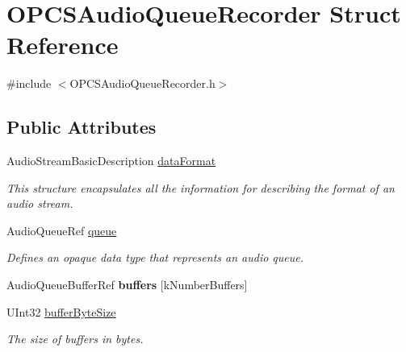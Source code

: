 \hypertarget{struct_o_p_c_s_audio_queue_recorder}{}\section{O\+P\+C\+S\+Audio\+Queue\+Recorder Struct Reference}
\label{struct_o_p_c_s_audio_queue_recorder}


{\ttfamily \#include $<$O\+P\+C\+S\+Audio\+Queue\+Recorder.\+h$>$}

\subsection*{Public Attributes}
\begin{DoxyCompactItemize}
\item 
\hypertarget{struct_o_p_c_s_audio_queue_recorder_a28f29c8faffd7725fad94e04f9795c66}{}\label{struct_o_p_c_s_audio_queue_recorder_a28f29c8faffd7725fad94e04f9795c66} 
Audio\+Stream\+Basic\+Description \hyperlink{struct_o_p_c_s_audio_queue_recorder_a28f29c8faffd7725fad94e04f9795c66}{data\+Format}
\begin{DoxyCompactList}\small\item\em This structure encapsulates all the information for describing the format of an audio stream. \end{DoxyCompactList}\item 
\hypertarget{struct_o_p_c_s_audio_queue_recorder_ab0f9b6a58c9eba28570279747b197125}{}\label{struct_o_p_c_s_audio_queue_recorder_ab0f9b6a58c9eba28570279747b197125} 
Audio\+Queue\+Ref \hyperlink{struct_o_p_c_s_audio_queue_recorder_ab0f9b6a58c9eba28570279747b197125}{queue}
\begin{DoxyCompactList}\small\item\em Defines an opaque data type that represents an audio queue. \end{DoxyCompactList}\item 
\hypertarget{struct_o_p_c_s_audio_queue_recorder_ab00fc8ed084a7073f71de2679f0545dd}{}\label{struct_o_p_c_s_audio_queue_recorder_ab00fc8ed084a7073f71de2679f0545dd} 
Audio\+Queue\+Buffer\+Ref {\bfseries buffers} \mbox{[}k\+Number\+Buffers\mbox{]}
\item 
\hypertarget{struct_o_p_c_s_audio_queue_recorder_a0159f53e5d30046f1c556f6b09607383}{}\label{struct_o_p_c_s_audio_queue_recorder_a0159f53e5d30046f1c556f6b09607383} 
U\+Int32 \hyperlink{struct_o_p_c_s_audio_queue_recorder_a0159f53e5d30046f1c556f6b09607383}{buffer\+Byte\+Size}
\begin{DoxyCompactList}\small\item\em The size of buffers in bytes. \end{DoxyCompactList}\item 

\end{DoxyCompactItemize}
